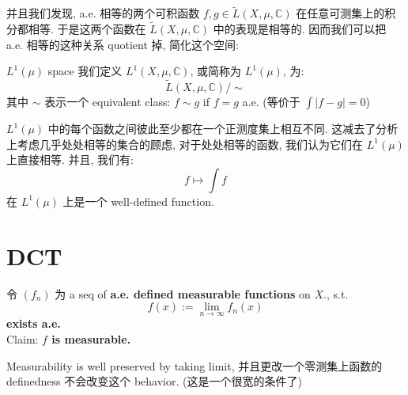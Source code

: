 \documentclass[lang=cn,11pt]{elegantbook}
\begin{document}
并且我们发现, a.e. 相等的两个可积函数 $f,g \in \tilde{L}(X, \mu, \mathbb{C})$ 在任意可测集上的积分都相等. 于是这两个函数在 $\tilde{L}(X, \mu, \mathbb{C})$ 中的表现是相等的. 因而我们可以把 a.e. 相等的这种关系 quotient 掉, 简化这个空间:


\begin{definition}{$L^1(\mu)$ space}
    我们定义 $L^1(X, \mu, \mathbb{C})$, 或简称为 $L^1(\mu)$, 为:$$
    \tilde{L}(X, \mu, \mathbb{C}) / \sim 
    $$
其中 $\sim$ 表示一个 equivalent class: $f\sim g$ if $f=g$ a.e. (等价于 $\int |f-g| = 0$)
 \end{definition}
$L^1(\mu)$ 中的每个函数之间彼此至少都在一个正测度集上相互不同. 这减去了分析上考虑几乎处处相等的集合的顾虑, 对于处处相等的函数, 我们认为它们在 $L^1(\mu)$ 上直接相等. 并且, 我们有: $$
f \mapsto \int f
$$
在 $L^1(\mu)$ 上是一个 well-defined function.




\section{DCT}


\begin{lemma}
    令 $(f_n)$ 为 a seq of \textbf{a.e. defined measurable functions} on $X$., s.t. \[
    f(x) := \lim_{n\to \infty} f_n(x) 
    \] \textbf{exists a.e.}\\
    Claim: \textbf{$f$ is measurable.}
\end{lemma}
\begin{remark}
    Measurability is well preserved by taking limit, 并且更改一个零测集上函数的 definedness 不会改变这个 behavior. (这是一个很宽的条件了)
\end{remark}
\end{document}
